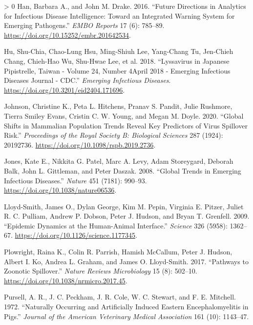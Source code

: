 \documentclass[10pt,oneside]{article}
\newlength{\cslhangindent}
\newenvironment{CSLReferences}[3] %
 {%
  \setlength{\parindent}{0pt}
  \ifodd #1 \everypar{\setlength{\hangindent}{\cslhangindent}}\ignorespaces\fi
  \ifnum #2 > 0
  \setlength{\parskip}{#2\baselineskip}
  \fi
 }%
 {}
\begin{document}
\begin{CSLReferences}{1}{0}
\leavevmode\hypertarget{ref-Han2016FutDir}{}%
Han, Barbara A., and John M. Drake. 2016. {``Future Directions in
Analytics for Infectious Disease Intelligence: Toward an Integrated
Warning System for Emerging Pathogens.''} \emph{EMBO Reports} 17 (6):
785--89. \url{https://doi.org/10.15252/embr.201642534}.

\leavevmode\hypertarget{ref-Hu2018LysJap}{}%
Hu, Shu-Chia, Chao-Lung Hsu, Ming-Shiuh Lee, Yang-Chang Tu, Jen-Chieh
Chang, Chieh-Hao Wu, Shu-Hwae Lee, et al. 2018. {``Lyssavirus in
Japanese Pipistrelle, Taiwan - Volume 24, Number 4April 2018 - Emerging
Infectious Diseases Journal - CDC.''} \emph{Emerging Infectious
Diseases}. \url{https://doi.org/10.3201/eid2404.171696}.

\leavevmode\hypertarget{ref-Johnson2020GloShi}{}%
Johnson, Christine K., Peta L. Hitchens, Pranav S. Pandit, Julie
Rushmore, Tierra Smiley Evans, Cristin C. W. Young, and Megan M. Doyle.
2020. {``Global Shifts in Mammalian Population Trends Reveal Key
Predictors of Virus Spillover Risk.''} \emph{Proceedings of the Royal
Society B: Biological Sciences} 287 (1924): 20192736.
\url{https://doi.org/10.1098/rspb.2019.2736}.

\leavevmode\hypertarget{ref-Jones2008GloTre}{}%
Jones, Kate E., Nikkita G. Patel, Marc A. Levy, Adam Storeygard, Deborah
Balk, John L. Gittleman, and Peter Daszak. 2008. {``Global Trends in
Emerging Infectious Diseases.''} \emph{Nature} 451 (7181): 990--93.
\url{https://doi.org/10.1038/nature06536}.

\leavevmode\hypertarget{ref-Lloyd-Smith2009EpiDyn}{}%
Lloyd-Smith, James O., Dylan George, Kim M. Pepin, Virginia E. Pitzer,
Juliet R. C. Pulliam, Andrew P. Dobson, Peter J. Hudson, and Bryan T.
Grenfell. 2009. {``Epidemic Dynamics at the Human-Animal Interface.''}
\emph{Science} 326 (5958): 1362--67.
\url{https://doi.org/10.1126/science.1177345}.

\leavevmode\hypertarget{ref-Plowright2017PatZoo}{}%
Plowright, Raina K., Colin R. Parrish, Hamish McCallum, Peter J. Hudson,
Albert I. Ko, Andrea L. Graham, and James O. Lloyd-Smith. 2017.
{``Pathways to Zoonotic Spillover.''} \emph{Nature Reviews Microbiology}
15 (8): 502--10. \url{https://doi.org/10.1038/nrmicro.2017.45}.

\leavevmode\hypertarget{ref-Pursell1972NatOcc}{}%
Pursell, A. R., J. C. Peckham, J. R. Cole, W. C. Stewart, and F. E.
Mitchell. 1972. {``Naturally Occurring and Artificially Induced Eastern
Encephalomyelitis in Pigs.''} \emph{Journal of the American Veterinary
Medical Association} 161 (10): 1143--47.


\end{CSLReferences}
\end{document}
